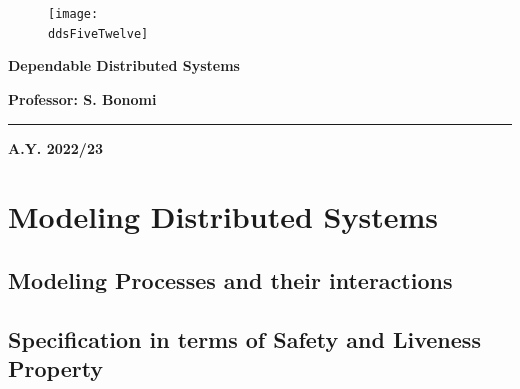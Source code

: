 

	
	\begin{center}
		\begin{figure}[h]
			\centering
			\texttt{[image: \\ddsFiveTwelve]}
		\end{figure}
		\vspace{1cm} 
		{\fontsize{28}{34}\selectfont \textbf{Dependable Distributed Systems}}
	\end{center}

	\vspace{1cm} 
	
	\begin{center}
	{\fontsize{22}{28}\selectfont \textbf{Professor: S. Bonomi}}
	\end{center}

	\vspace{1cm} 

	\textcolor{blue!60!black}{\rule{\linewidth}{2pt}}
	
	\vspace{10cm} 
	
	\begin{center}
	\textbf{A.Y. 2022/23} 
	\end{center}

	\thispagestyle{empty}
	
	\newpage
	
	\myTOC
		
	\newpage

	\section{Modeling Distributed Systems}
	
	\subsection{Modeling Processes and their interactions}
	
	\subsection{Specification in terms of Safety and Liveness Property}
	
